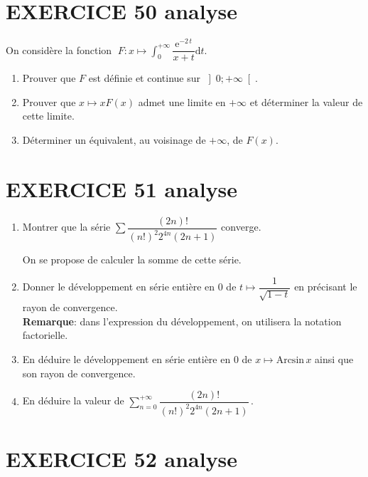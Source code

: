 \documentclass[10pt,oneside]{article}
\begin{document}
\begin{flushleft}
\section*{EXERCICE 50 \:analyse }



On considère la fonction   $\;F : x \mapsto  \displaystyle\int_{0}^{+\infty} \dfrac{\text{e}^{-2\,t}}{x+t} \mathrm{d}t$.
\begin{enumerate}
\item
Prouver que  $F$ est définie et continue sur $\left]  0;+\infty\right[ $.
 \item 
Prouver que $x\longmapsto xF(x)$ admet une limite en $+\infty$ et déterminer la valeur de cette limite.

 \item
Déterminer un équivalent, au voisinage de $+\infty$,  de $F(x)$.

\end{enumerate}
 

\section*{EXERCICE 51 \:analyse }



\begin{enumerate}
\item Montrer que la série $\sum\dfrac{(2n)!}{(n!)^{2}2^{4n}(2n+1)}$ converge.

\medskip

On se propose de calculer la somme de cette série.

\medskip

\item Donner le développement en série entière en 0 de $t\longmapsto\dfrac{1}{\sqrt{1-t}}$ en précisant le rayon de convergence.\\
\textbf{Remarque}: dans l'expression du développement, on utilisera la notation factorielle.

\item En déduire le développement en série entière en 0 de $x\longmapsto\mathrm{Arcsin}\,x$ ainsi que son rayon de convergence.

\item En déduire la valeur de  $\displaystyle\sum\limits_{n=0}^{+\infty}\dfrac{(2n)!}{(n!)^{2}2^{4n}(2n+1)}$\,.

\end{enumerate}


\section*{EXERCICE 52 \:analyse }


\end{flushleft}
\end{document}
